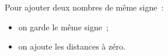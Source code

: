 Pour ajouter deux nombres de même signe~:
\begin{itemize}[label=$-$]
    \item on garde le même signe~;
    \item on ajoute les distances à zéro.
\end{itemize}